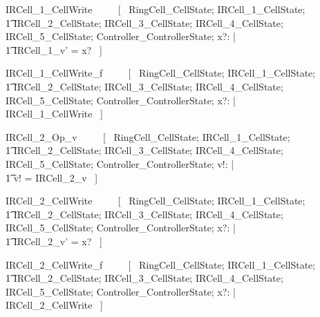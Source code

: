 \documentclass{article}
\begin{document}
\begin{zed}
IRCell\_1\_CellWrite ~~~~ [~ 
    \Xi RingCell\_CellState; 
    \Delta IRCell\_1\_CellState; \\
    \t1 \Xi IRCell\_2\_CellState; 
    \Xi IRCell\_3\_CellState;
    \Xi IRCell\_4\_CellState; 
    \Xi IRCell\_5\_CellState; 
    \Xi Controller\_ControllerState; 
    x?: \nat | \\
    \t1 IRCell\_1\_v' = x? ~] \\
\end{zed}

\begin{zed}
IRCell\_1\_CellWrite\_f ~~~~ [~ 
    \Xi RingCell\_CellState; 
    \Xi IRCell\_1\_CellState; \\
    \t1 \Xi IRCell\_2\_CellState; 
    \Xi IRCell\_3\_CellState;
    \Xi IRCell\_4\_CellState; 
    \Xi IRCell\_5\_CellState; 
    \Xi Controller\_ControllerState; 
    x?: \nat | \\
    \lnot \pre IRCell\_1\_CellWrite ~] \\
\end{zed}

\begin{zed}
IRCell\_2\_Op\_v ~~~~ [~ 
    \Xi RingCell\_CellState; 
    \Xi IRCell\_1\_CellState; \\
    \t1 \Xi IRCell\_2\_CellState; 
    \Xi IRCell\_3\_CellState;
    \Xi IRCell\_4\_CellState; 
    \Xi IRCell\_5\_CellState; 
    \Xi Controller\_ControllerState; v!: \nat | \\
    \t1 v! = IRCell\_2\_v ~] \\
\end{zed}

\begin{zed}
IRCell\_2\_CellWrite ~~~~ [~ 
    \Xi RingCell\_CellState; 
    \Xi IRCell\_1\_CellState; \\
    \t1 \Delta IRCell\_2\_CellState; 
    \Xi IRCell\_3\_CellState;
    \Xi IRCell\_4\_CellState; 
    \Xi IRCell\_5\_CellState; 
    \Xi Controller\_ControllerState; 
    x?: \nat | \\
    \t1 IRCell\_2\_v' = x? ~] \\
\end{zed}

\begin{zed}
IRCell\_2\_CellWrite\_f ~~~~ [~ 
    \Xi RingCell\_CellState; 
    \Xi IRCell\_1\_CellState; \\
    \t1 \Xi IRCell\_2\_CellState; 
    \Xi IRCell\_3\_CellState;
    \Xi IRCell\_4\_CellState; 
    \Xi IRCell\_5\_CellState; 
    \Xi Controller\_ControllerState; 
    x?: \nat | \\
    \lnot \pre IRCell\_2\_CellWrite ~] \\
\end{zed}
\end{document}
